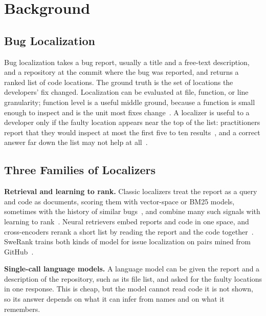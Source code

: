 \documentclass[acmsmall,screen,review,anonymous]{acmart}
\begin{document}
\section{Background}
\label{sec:background}

\subsection{Bug Localization}

Bug localization takes a bug report, usually a title and a free-text description, and a repository at the commit where the bug was reported, and returns a ranked list of code locations. The ground truth is the set of locations the developers' fix changed. Localization can be evaluated at file, function, or line granularity; function level is a useful middle ground, because a function is small enough to inspect and is the unit most fixes change~\cite{chen2025locagent}. A localizer is useful to a developer only if the faulty location appears near the top of the list: practitioners report that they would inspect at most the first five to ten results~\cite{kochhar2016practitioners}, and a correct answer far down the list may not help at all~\cite{parnin2011automated}.

\subsection{Three Families of Localizers}

\textbf{Retrieval and learning to rank.} Classic localizers treat the report as a query and code as documents, scoring them with vector-space or BM25 models, sometimes with the history of similar bugs~\cite{zhou2012buglocator,saha2013bluir}, and combine many such signals with learning to rank~\cite{ye2014learning}. Neural retrievers embed reports and code in one space, and cross-encoders rerank a short list by reading the report and the code together~\cite{nogueira2019passage}. SweRank trains both kinds of model for issue localization on pairs mined from GitHub~\cite{reddy2025swerank}.

\textbf{Single-call language models.} A language model can be given the report and a description of the repository, such as its file list, and asked for the faulty locations in one response. This is cheap, but the model cannot read code it is not shown, so its answer depends on what it can infer from names and on what it remembers.
\end{document}
